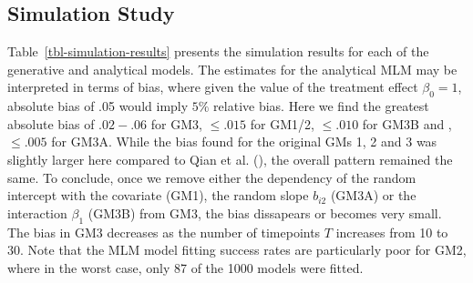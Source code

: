 \documentclass[
  11pt,
  a4paper,
]{article}
\begin{document}
\subsection{Simulation Study}\label{simulation-study}

Table~\ref{tbl-simulation-results} presents the simulation results for
each of the generative and analytical models. The estimates for the
analytical MLM may be interpreted in terms of bias, where given the
value of the treatment effect \(\beta_0 = 1\), absolute bias of .05
would imply \(5\%\) relative bias. Here we find the greatest absolute
bias of \(.02-.06\) for GM3, \(\leq .015\) for GM1/2, \(\leq .010\) for
GM3B and , \(\leq .005\) for GM3A. While the bias found for the original
GMs 1, 2 and 3 was slightly larger here compared to Qian et al.
(), the overall pattern remained the same.
To conclude, once we remove either the dependency of the random
intercept with the covariate (GM1), the random slope \(b_{i2}\) (GM3A)
or the interaction \(\beta_1\) (GM3B) from GM3, the bias dissapears or
becomes very small. The bias in GM3 decreases as the number of
timepoints \(T\) increases from 10 to 30. Note that the MLM model
fitting success rates are particularly poor for GM2, where in the worst
case, only 87 of the 1000 models were fitted.
\end{document}
